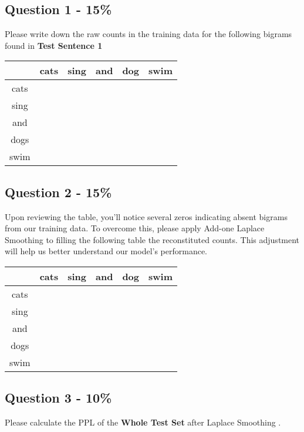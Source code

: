\documentclass{article}
\begin{document}
\newpage

\subsection*{Question 1 - 15\%}
Please write down the raw counts in the training data for the following 
bigrams found in \textbf{Test Sentence 1}\\
\begin{center}
    \begin{tabular}{|c|c|c|c|c|c|}
    \hline
     & cats & sing & and & dog & swim \\ \hline
    cats &  & &&& \\ \hline
    sing &  & &&& \\ \hline
    and &  & &&& \\ \hline
    dogs &  & &&& \\ \hline
    swim &  & &&& \\ \hline
    \end{tabular}
\end{center}


\subsection*{Question 2 - 15\%}
Upon reviewing the table, you'll notice several zeros indicating absent bigrams from our training data. To overcome this, please apply Add-one Laplace Smoothing to filling the following table the reconstituted counts. This adjustment 
will help us better understand our model's performance.\\
\begin{center}
    \begin{tabular}{|c|c|c|c|c|c|}
    \hline
     & cats & sing & and & dog & swim \\ \hline
    cats &  & &&& \\ \hline
    sing &  & &&& \\ \hline
    and &  & &&& \\ \hline
    dogs &  & &&& \\ \hline
    swim &  & &&& \\ \hline
    \end{tabular}
\end{center}
\subsection*{Question 3 - 10\%}
Please calculate the PPL of the \textbf{Whole Test Set} after Laplace Smoothing .
\end{document}

